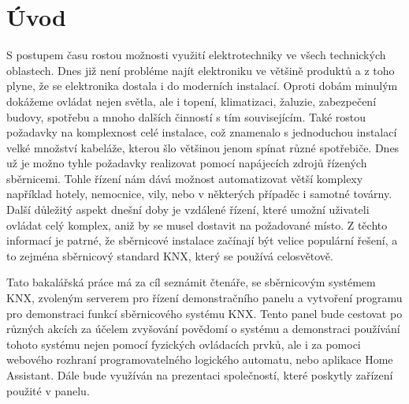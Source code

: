 \chapter*{Úvod}
{}

S postupem času rostou možnosti využití elektrotechniky ve všech technických oblastech. Dnes již není probléme najít elektroniku ve většině produktů a z toho plyne, že se elektronika dostala i do moderních instalací. Oproti dobám minulým dokážeme ovládat nejen světla, ale i topení, klimatizaci, žaluzie, zabezpečení budovy, spotřebu a mnoho dalších činností s tím souvisejícím. Také rostou požadavky na komplexnost celé instalace, což znamenalo s jednoduchou instalací velké množství kabeláže, kterou šlo většinou jenom spínat různé spotřebiče. Dnes už je možno tyhle požadavky realizovat pomocí napájecích zdrojů řízených sběrnicemi. Tohle řízení nám dává možnost automatizovat větší komplexy například hotely, nemocnice, vily, nebo v některých případěc i samotné továrny. Další důležitý aspekt dnešní doby je vzdálené řízení, které umožní uživateli ovládat celý komplex, aniž by se musel dostavit na požadované místo. Z těchto informací je patrné, že sběrnicové instalace začínají být velice populární řešení, a to zejména sběrnicový standard KNX, který se používá celosvětově.

Tato bakalářská práce má za cíl seznámit čtenáře, se sběrnicovým systémem KNX, zvoleným serverem pro řízení demonstračního panelu a vytvoření programu pro demonstraci funkcí sběrnicového systému KNX. Tento panel bude cestovat po různých akcích za účelem zvyšování povědomí o systému a demonstraci používání tohoto systému nejen pomocí fyzických ovládacích prvků, ale i za pomoci webového rozhraní programovatelného logického automatu, nebo aplikace Home Assistant. Dále bude využíván na prezentaci společností, které poskytly zařízení použité v panelu.

